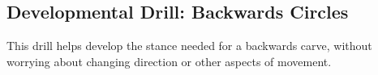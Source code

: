\subsection*{Developmental Drill: Backwards Circles}

This drill helps develop the stance needed for a backwards carve, without worrying about changing direction or other aspects of movement.  
